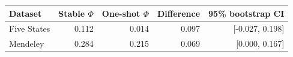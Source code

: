 \begin{tabular}{lrrrr}
\toprule
Dataset & Stable $\Phi$ & One-shot $\Phi$ & Difference & 95\% bootstrap CI \\
\midrule
Five States & 0.112 & 0.014 & 0.097 & [-0.027, 0.198] \\
Mendeley & 0.284 & 0.215 & 0.069 & [0.000, 0.167] \\
\bottomrule
\end{tabular}
